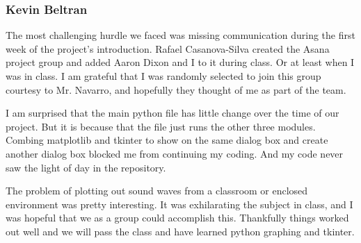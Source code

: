 \documentclass[11pt]{article}
\begin{document}
\subsubsection{Kevin Beltran}

The most challenging hurdle we faced was missing communication during the first week of the project's introduction. Rafael Casanova-Silva created the Asana project group and added Aaron Dixon and I to it during class. Or at least when I was in class. I am grateful that I was randomly selected to join this group courtesy to Mr. Navarro, and hopefully they thought of me as part of the team.  

I am surprised that the main python file has little change over the time of our project. But it is because that the file just runs the other three modules. Combing matplotlib and tkinter to show on the same dialog box and create another dialog box blocked me from continuing my coding. And my code never saw the light of day in the repository. 

The problem of plotting out sound waves from a classroom or enclosed environment was pretty interesting. It was exhilarating the subject in class, and I was hopeful that we as a group could accomplish this. Thankfully things worked out well and we will pass the class and have learned python graphing and tkinter. 
\end{document}

